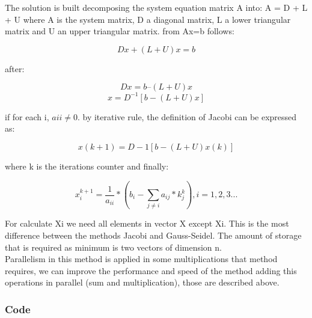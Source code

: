 \documentclass{article}
\begin{document}
The solution is built decomposing the system equation matrix A into:
A = D + L + U where A is the system matrix, D a diagonal matrix, L a lower
triangular matrix and U an upper triangular matrix.
from Ax=b follows:
\begin{center}
  \[Dx + (L + U)x = b\]
\end{center}
after:
\begin{center}
  \[Dx = b – (L + U)x\]
  \[x = D^{-1}[b-(L+U)x]\]
\end{center}
if for each i, $aii \neq  0.$ by iterative rule, the definition of Jacobi can be
expressed as:
\begin{center}
  \[x(k+1) = D-1 [b-(L + U)x(k)]\]
\end{center}
where k is the iterations counter and finally:
\begin{center}
  \[x_{i}^{k+1} = \frac{1}{a_{ii}}*(b_{i}-\sum_{j\neq i}a_{ij}*k_{j}^{k}) , i=1,2,3...\]
\end{center}
For calculate Xi we need all elements in vector X except Xi. This is the most
difference between the methods Jacobi and Gauss-Seidel. The amount of storage
that is required as minimum is two vectors of dimension n.\\

Parallelism in this method is applied in some multiplications that method
requires, we can improve the performance and speed of the method adding this
operations in parallel (sum and multiplication), those are described above.

\subsubsection{Code}
\end{document}
